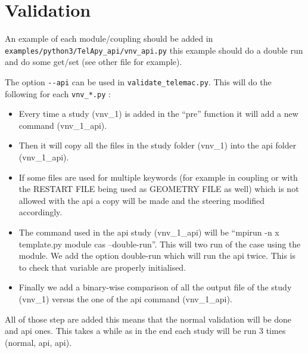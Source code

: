 \section{Validation}
%
An example of each module/coupling should be added in
\verb!examples/python3/TelApy_api/vnv_api.py! this example should do a double
run and do some get/set (see other file for example).

The option \verb!--api! can be used in \verb!validate_telemac.py!. This will do
the following for each \verb!vnv_*.py! :
\begin{itemize}
  \item Every time a study (vnv\_1) is added in the ``pre'' function it will
    add a new command (vnv\_1\_api).
  \item Then it will copy all the files in the study folder (vnv\_1) into the
    api folder (vnv\_1\_api).
  \item If some files are used for multiple keywords (for example in coupling
    or with the RESTART FILE being used as GEOMETRY FILE as well) which is not
    allowed with the api a copy will be made and the steering modified
    accordingly.
  \item The command used in the api study (vnv\_1\_api) will be ``mpirun -n x
    template.py module cas --double-run''. This will two run of the case using
    the \TelApy{} module. We add the option double-run which will run the api
    twice. This is to check that variable are properly initialised.
  \item Finally we add a binary-wise comparison of all the output file of the
    study (vnv\_1) versus the one of the api command (vnv\_1\_api).
\end{itemize}

All of those step are added this means that the normal validation will be done
and api ones. This takes a while as in the end each study will be run 3
times (normal, api, api).

